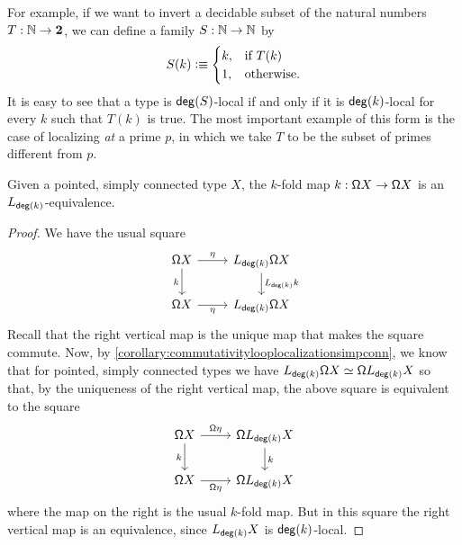 For example, if we want to invert a decidable subset of the natural numbers
$T : \mathbb{N} \to \mathbf{2}$, we can define a family $S : \mathbb{N} \to \mathbb{N}$ by
\[
    S(k) \vcentcolon\equiv \begin{cases} k, & \text{if $T(k)$} \\
                              1, & \text{otherwise.}
                \end{cases}
\]
It is easy to see that a type is $\mathsf{deg}(S)$-local if and only if it is $\mathsf{deg}(k)$-local for every $k$ such that $T(k)$ is true.
The most important example of this form is the case of localizing \emph{at} a prime $p$,
in which we take $T$ to be the subset of primes different from $p$.

\begin{lem}\label{lemma:pmapisorthogonal}
    Given a pointed, simply connected type $X$, the $k$-fold map $k : \mathsf{\Omega} X \to \mathsf{\Omega} X$
    is an $L_{\mathsf{deg}(k)}$-equivalence.
\end{lem}

\begin{proof}
    We have the usual square
\begin{equation*}
\begin{tikzcd}
\loopspacesym X \arrow[d,swap,"k"] \arrow[r,"\eta"] & L_{\degg(k)} \loopspacesym X \arrow[d,"L_{\degg(k)} k"] \\
\loopspacesym X \arrow[r,swap,"\eta"] & L_{\degg(k)} \loopspacesym X
\end{tikzcd}
\end{equation*}
    Recall that the right vertical map is the unique map that makes the square commute.
    Now, by \cref{corollary:commutativitylooplocalizationsimpconn}, we know that for pointed, simply connected types we have
    $L_{\mathsf{deg}(k)} \mathsf{\Omega} X \simeq \mathsf{\Omega} L_{\mathsf{deg}(k)} X$ so that,
    by the uniqueness of the right vertical map, the above square is equivalent to the square
\begin{equation*}
\begin{tikzcd}
\loopspacesym X \arrow[d,swap,"k"] \arrow[r,"\loopspacesym \eta"] & \loopspacesym L_{\degg(k)} X \arrow[d,"k"] \\
\loopspacesym X \arrow[r,swap,"\loopspacesym \eta"] & \loopspacesym L_{\degg(k)} X
\end{tikzcd}
\end{equation*}
    where the map on the right is the usual $k$-fold map.
    But in this square the right vertical map is an equivalence, since $L_{\mathsf{deg}(k)} X$
    is $\mathsf{deg}(k)$-local.
\end{proof}

